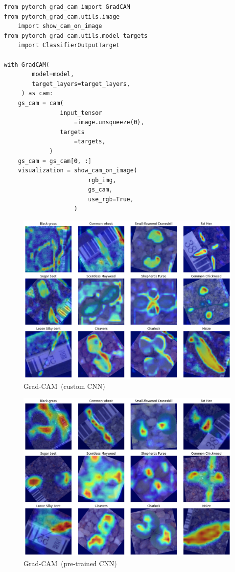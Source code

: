 \begin{minipage}{0.9\linewidth}\begin{lstlisting}[caption={Generate CAMs using Pytorch-Grad-CAM.},label={lst:grad-cam}]
from pytorch_grad_cam import GradCAM
from pytorch_grad_cam.utils.image
    import show_cam_on_image
from pytorch_grad_cam.utils.model_targets
    import ClassifierOutputTarget

with GradCAM(
        model=model,
        target_layers=target_layers,
     ) as cam:
    gs_cam = cam(
                input_tensor
                    =image.unsqueeze(0),
                targets
                    =targets,
             )
    gs_cam = gs_cam[0, :]
    visualization = show_cam_on_image(
                        rgb_img,
                        gs_cam,
                        use_rgb=True,
                    )
\end{lstlisting}\end{minipage}

\begin{figure}[htbp]
    \centerline{\includegraphics[width=0.9\linewidth]{../../resources/custom_cnn/grad_cam.png}}
    \caption{Grad-CAM~(custom CNN)}
    \label{fig:grad-cam-custom-cnn}
\end{figure}

\begin{figure}[htbp]
    \centerline{\includegraphics[width=0.9\linewidth]{../../resources/resnet/grad_cam.png}}
    \caption{Grad-CAM~(pre-trained CNN)}
    \label{fig:grad-cam-pretrained-cnn}
\end{figure}

